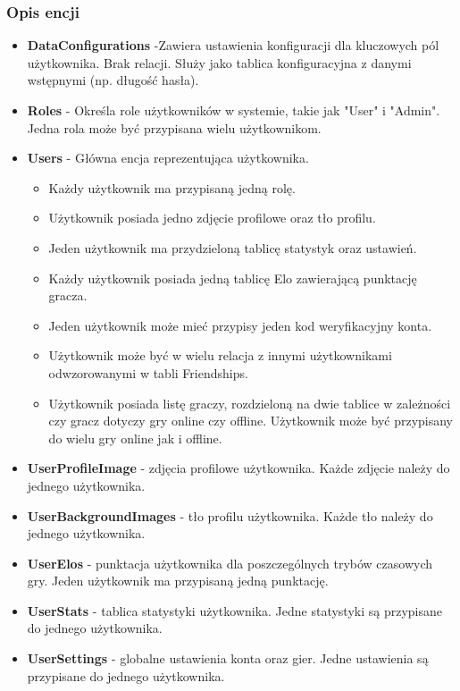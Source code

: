 \documentclass[12pt,a4paper]{article}
\begin{document}
        \subsubsection{Opis encji}
\begin{itemize}
    \item \textbf{DataConfigurations} -Zawiera ustawienia konfiguracji dla kluczowych pól użytkownika. Brak relacji. Służy jako tablica konfiguracyjna z danymi wstępnymi (np. długość hasła).
    \item \textbf{Roles} - Określa role użytkowników w systemie, takie jak "User" i "Admin". Jedna rola może być przypisana wielu użytkownikom.
    \item \textbf{Users} - Główna encja reprezentująca użytkownika.
    \begin{itemize}
        \item Każdy użytkownik ma przypisaną jedną rolę.
        \item Użytkownik posiada jedno zdjęcie profilowe oraz tło profilu.
        \item Jeden użytkownik ma przydzieloną tablicę statystyk oraz ustawień.
        \item Każdy użytkownik posiada jedną tablicę Elo zawierającą punktację gracza.
        \item Jeden użytkownik może mieć przypisy jeden kod weryfikacyjny konta.
        \item Użytkownik może być w wielu relacja z innymi użytkownikami odwzorowanymi w tabli Friendships.
        \item Użytkownik posiada listę graczy, rozdzieloną na dwie tablice w zależności czy gracz dotyczy gry online czy offline. Użytkownik może być przypisany do wielu gry online jak i offline.
    \end{itemize}
    \item \textbf{UserProfileImage} - zdjęcia profilowe użytkownika. Każde zdjęcie należy do jednego użytkownika.
    \item \textbf{UserBackgroundImages} - tło profilu użytkownika. Każde tło należy do jednego użytkownika.
    \item \textbf{UserElos} - punktacja użytkownika dla poszczególnych trybów czasowych gry. Jeden użytkownik ma przypisaną jedną punktację.
    \item \textbf{UserStats} - tablica statystyki użytkownika. Jedne statystyki są przypisane do jednego użytkownika.
    \item \textbf{UserSettings} - globalne ustawienia konta oraz gier. Jedne ustawienia są przypisane do jednego użytkownika.

\end{itemize}
\end{document}
